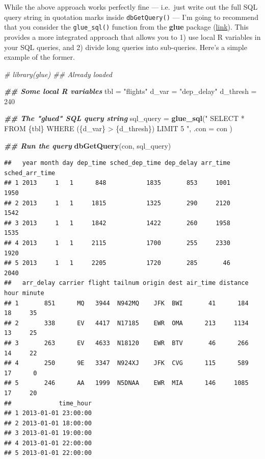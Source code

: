 \documentclass[
]{article}
\newenvironment{Shaded}{\begin{snugshade}}{\end{snugshade}}
\newcommand{\AttributeTok}[1]{\textcolor[rgb]{0.13,0.29,0.53}{#1}}
\newcommand{\CommentTok}[1]{\textcolor[rgb]{0.56,0.35,0.01}{\textit{#1}}}
\newcommand{\DecValTok}[1]{\textcolor[rgb]{0.00,0.00,0.81}{#1}}
\newcommand{\DocumentationTok}[1]{\textcolor[rgb]{0.56,0.35,0.01}{\textbf{\textit{#1}}}}
\newcommand{\FunctionTok}[1]{\textcolor[rgb]{0.13,0.29,0.53}{\textbf{#1}}}
\newcommand{\NormalTok}[1]{#1}
\newcommand{\OtherTok}[1]{\textcolor[rgb]{0.56,0.35,0.01}{#1}}
\newcommand{\StringTok}[1]{\textcolor[rgb]{0.31,0.60,0.02}{#1}}
\begin{document}
While the above approach works perfectly fine --- i.e.~just write out
the full SQL query string in quotation marks inside
\texttt{dbGetQuery()} --- I'm going to recommend that you consider the
\texttt{glue\_sql()} function from the \textbf{glue} package
(\href{https://glue.tidyverse.org/}{link}). This provides a more
integrated approach that allows you to 1) use local R variables in your
SQL queries, and 2) divide long queries into sub-queries. Here's a
simple example of the former.

\begin{Shaded}
\begin{Highlighting}[]
\CommentTok{\# library(glue) \#\# Already loaded}

\DocumentationTok{\#\# Some local R variables}
\NormalTok{tbl }\OtherTok{=} \StringTok{"flights"}
\NormalTok{d\_var }\OtherTok{=} \StringTok{"dep\_delay"}
\NormalTok{d\_thresh }\OtherTok{=} \DecValTok{240}

\DocumentationTok{\#\# The "glued" SQL query string}
\NormalTok{sql\_query }\OtherTok{=}
  \FunctionTok{glue\_sql}\NormalTok{(}\StringTok{"}
\StringTok{  SELECT *}
\StringTok{  FROM \{\textasciigrave{}tbl\textasciigrave{}\}}
\StringTok{  WHERE (\{\textasciigrave{}d\_var\textasciigrave{}\} \textgreater{} \{d\_thresh\})}
\StringTok{  LIMIT 5}
\StringTok{  "}\NormalTok{,}
  \AttributeTok{.con =}\NormalTok{ con}
\NormalTok{  )}

\DocumentationTok{\#\# Run the query}
\FunctionTok{dbGetQuery}\NormalTok{(con, sql\_query)}
\end{Highlighting}
\end{Shaded}

\begin{verbatim}
##   year month day dep_time sched_dep_time dep_delay arr_time sched_arr_time
## 1 2013     1   1      848           1835       853     1001           1950
## 2 2013     1   1     1815           1325       290     2120           1542
## 3 2013     1   1     1842           1422       260     1958           1535
## 4 2013     1   1     2115           1700       255     2330           1920
## 5 2013     1   1     2205           1720       285       46           2040
##   arr_delay carrier flight tailnum origin dest air_time distance hour minute
## 1       851      MQ   3944  N942MQ    JFK  BWI       41      184   18     35
## 2       338      EV   4417  N17185    EWR  OMA      213     1134   13     25
## 3       263      EV   4633  N18120    EWR  BTV       46      266   14     22
## 4       250      9E   3347  N924XJ    JFK  CVG      115      589   17      0
## 5       246      AA   1999  N5DNAA    EWR  MIA      146     1085   17     20
##             time_hour
## 1 2013-01-01 23:00:00
## 2 2013-01-01 18:00:00
## 3 2013-01-01 19:00:00
## 4 2013-01-01 22:00:00
## 5 2013-01-01 22:00:00
\end{verbatim}
\end{document}
